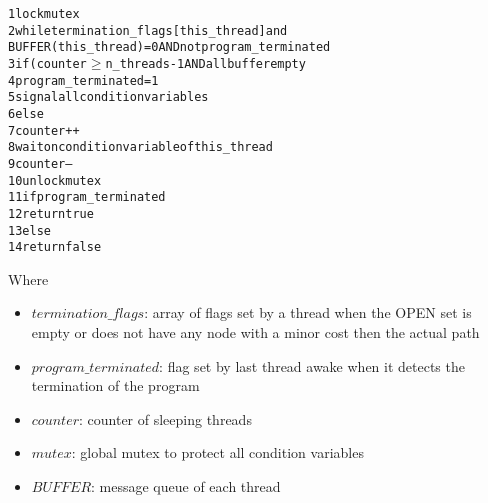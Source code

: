 \begin{alltt}
    1 lock mutex
    2 while termination_flags[this_thread] and
    BUFFER(this_thread) = 0 AND not program_terminated
    3   if(counter \( \geq \) n_threads - 1 AND all buffer empty
    4       program_terminated = 1
    5       signal all condition variables
    6   else
    7       counter++
    8       wait on condition variable of this_thread
    9       counter--
    10 unlock mutex
    11 if program_terminated
    12   return true
    13 else
    14   return false
\end{alltt}

Where
\begin{itemize}
    \item $termination\_flags$: array of flags set by a thread when the OPEN set is empty or does not have any node with a minor cost then the actual path
    \item $program\_terminated$: flag set by last thread awake when it detects the termination of the program
    \item $counter$: counter of sleeping threads
    \item $mutex$: global mutex to protect all condition variables
    \item $BUFFER$: message queue of each thread
\end{itemize}

